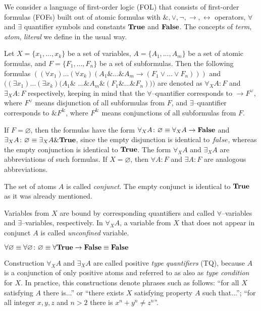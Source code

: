 \documentclass[a4paper,12pt]{article}
\begin{document}
We consider a language of first-order logic (FOL) that consists of first-order formulas (FOFs) built out of atomic formulas with $\&, \vee, \neg, \rightarrow, \leftrightarrow$ operators, $\forall$ and $\exists$ quantifier symbols and constants $\text{\textbf{True}}$ and $\text{\textbf{False}}$.  The concepts of \emph{term}, \emph{atom}, \emph{literal} we define in the usual way.

Let $X = \{x_1,\ldots,x_k\}$ be a set of variables, $A = \{A_1,\ldots,A_m\}$ be a set of atomic formulas, and $F = \{F_1,\ldots,F_n\}$ be a set of subformulas. Then the following formulas $((\forall x_1) \ldots (\forall x_k) (A_1 \& \ldots \& A_m \rightarrow (F_1 \vee \ldots \vee F_n)))$ and $((\exists x_1) \ldots (\exists x_k) (A_1 \&$ $\ldots \& A_m \& (F_1 \& \ldots \& F_n)))$ are denoted as  $\forall_XA\colon F$ and $\exists_XA\colon F$ respectively, keeping in mind that the $\forall$--quantifier corresponds to $\rightarrow F^{\vee}$, where $F^{\vee}$ means disjunction of all subformulas from $F$, and $\exists$--quantifier corresponds to $\& F^{\&}$, where $F^{\&}$ means conjunctions of all subformulas from $F$.

If $F = \varnothing$, then the formulas have the form $\forall_XA\colon\varnothing \equiv \forall_XA \rightarrow \text{\textbf{False}}$ and $\exists_XA\colon\varnothing \equiv \exists_XA \& \text{\textbf{True}}$, since the empty disjunction is identical to $false$, whereas the empty conjunction is identical to $\text{\textbf{True}}$.  The form $\forall_XA$ and $\exists_XA$ are abbreviations of such formulas.  If $X = \varnothing$, then $\forall A\colon F$ and $\exists A\colon F$ are analogous abbreviations.

The set of atoms $A$ is called {\em conjunct}. The empty conjunct is identical to $\text{\textbf{True}}$ as it was already mentioned.

Variables from $X$ are bound by corresponding quantifiers and called $\forall$--variables and $\exists$--variables, respectively. In $\forall_XA$, a variable from $X$ that does not appear in conjunct $A$ is called {\em unconfined} variable.

$\forall \varnothing \equiv \forall \varnothing\colon\varnothing \equiv \forall \text{\textbf{True}} \rightarrow \text{\textbf{False}} \equiv \text{\textbf{False}}$

Construction $\forall_XA$ and $\exists_XA$ are called positive \emph{type quantifiers} (TQ), because $A$ is a conjunction of only positive atoms and referred to as also as \emph{type condition} for $X$. In practice, this constructions denote phrases such as follows: ``for all $X$ satisfying $A$ there is...'' or ``there exists $X$ satisfying property $A$ such that...''; ``for all integer $x,y,z$ and $n>2$ there is $x^n + y^n \ne z^n$''.
\end{document}
